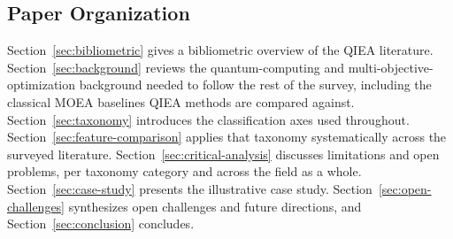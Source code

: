 \subsection{Paper Organization}
\label{sec:introduction:organization}

Section~\ref{sec:bibliometric} gives a bibliometric overview of the QIEA
literature. Section~\ref{sec:background} reviews the quantum-computing and
multi-objective-optimization background needed to follow the rest of the
survey, including the classical MOEA baselines QIEA methods are compared
against. Section~\ref{sec:taxonomy} introduces the classification axes
used throughout. Section~\ref{sec:feature-comparison} applies that
taxonomy systematically across the surveyed literature.
Section~\ref{sec:critical-analysis} discusses limitations and open
problems, per taxonomy category and across the field as a whole.
Section~\ref{sec:case-study} presents the illustrative case study.
Section~\ref{sec:open-challenges} synthesizes open challenges and future
directions, and Section~\ref{sec:conclusion} concludes.
